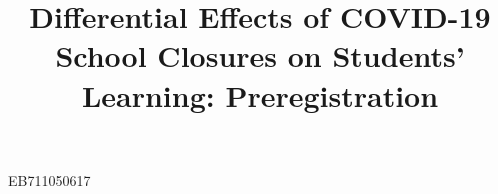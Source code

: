 \documentclass[
    a4paper,                %
    11pt,                   %
    stu,                    %
    donotrepeattitle,       %
    floatsintext,           %
    biblatex,               %
    colorlinks=true,        %
    linkcolor=red,          %
    anchorcolor=black,      %
    citecolor=blue,         %
    urlcolor=blue,          %
    bookmarks=true,         %
    bookmarksopen=false,    %
    bookmarksnumbered=true, %
    dvipsnames              %
]{apa7}
\title{Differential Effects of {COVID-19} School Closures on Students' Learning: Preregistration}
\begin{document}
\maketitle









 EB711050617

\printbibliography






\end{document}
